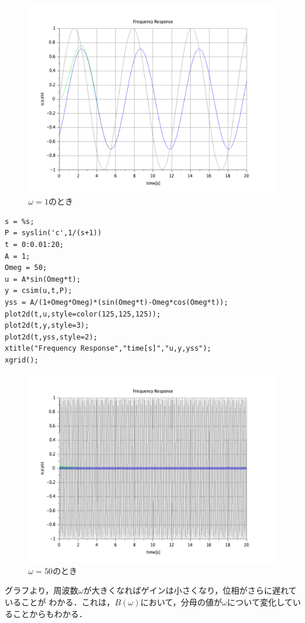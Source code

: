 \documentclass[a4paper,11pt]{jsarticle}
\begin{document}
\begin{enumerate}
\begin{figure}[H]
          \includegraphics[width=0.8\linewidth]{picture/3-1-1-1.png}
          \caption{$\omega=1$のとき}
          \label{3-1-1-1}
        \end{figure}

        \begin{lstlisting}[caption=図\ref{3-1-1-50}をプロットするコード, label=C:3-1-1-50]
s = %s;
P = syslin('c',1/(s+1))
t = 0:0.01:20;
A = 1;
Omeg = 50;
u = A*sin(Omeg*t);
y = csim(u,t,P);
yss = A/(1+Omeg*Omeg)*(sin(Omeg*t)-Omeg*cos(Omeg*t));
plot2d(t,u,style=color(125,125,125));
plot2d(t,y,style=3);
plot2d(t,yss,style=2);
xtitle("Frequency Response","time[s]","u,y,yss");
xgrid();
      \end{lstlisting}
        \begin{figure}[H]
          \centering
          \includegraphics[width=0.8\linewidth]{picture/3-1-1-50.png}
          \caption{$\omega = 50$のとき}
          \label{3-1-1-50}
        \end{figure}
        グラフより，周波数$\omega$が大きくなればゲインは小さくなり，位相がさらに遅れていることが
        わかる．これは，$B(\omega)$において，分母の値が$\omega$について変化していることからもわかる．
\end{enumerate}
\end{document}
